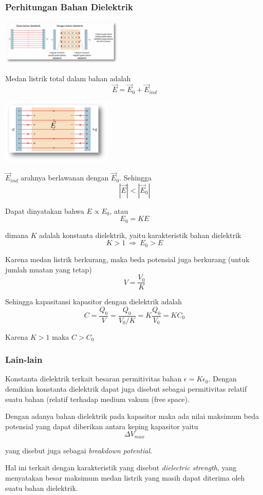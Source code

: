 \documentclass[twocolumn, 11pt]{article}%
\begin{document}
    \subsubsection{Perhitungan Bahan Dielektrik}%
    \begin{center}
        \includegraphics[width=220px]{13.png}
    \end{center}

    Medan listrik total dalam bahan adalah
    \[\vec E=\vec E_0 + \vec E_{ind} \]

    \begin{center}
        \includegraphics[width=200px]{14.png}
    \end{center}

    $\vec E_{ind}$ arahnya berlawanan dengan $\vec E_0$. Sehingga\\
    \[ |\vec E| < |\vec E_0|\]
    
    Dapat dinyatakan bahwa $E\propto E_0$, atau
    \[ E_0=KE \]

    dimana $K$ adalah konstanta dielektrik, yaitu karakteristik bahan dielektrik
    \[K>1\ \Rightarrow\ E_0 > E \]

    Karena medan listrik berkurang, maka beda potensial juga berkurang (untuk jumlah muatan yang tetap)
    \[V=\frac{V_0}{K} \]

    Sehingga kapasitansi kapasitor dengan dielektrik adalah
    \[C=\frac{Q_0}{V}=\frac{Q_0}{V_0/K}=K\frac{Q_0}{V_0}=KC_0 \]

    Karena $K>1$ maka $C>C_0$

    \subsubsection{Lain-lain}%
    Konstanta dielektrik terkait besaran permitivitas bahan $\epsilon=K\epsilon_0$. Dengan demikian konstanta dielektrik dapat juga disebut sebagai permitivitas relatif suatu bahan (relatif terhadap medium vakum (free space).

    Dengan adanya bahan dielektrik pada kapasitor maka ada nilai maksimum beda potensial yang dapat diberikan antara keping kapasitor yaitu
    \[\Delta V_{max}\]

    yang disebut juga sebagai \textit{breakdown potential}.

    Hal ini terkait dengan karakteristik yang disebut \textit{dielectric strength}, yang menyatakan besar maksimum medan listrik yang masih dapat diterima oleh suatu bahan dielektrik.
    
\end{document}
